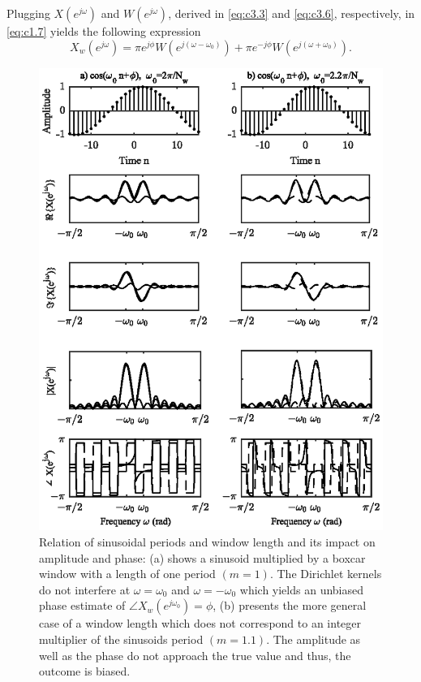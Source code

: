 \noindent Plugging $X(e^{j\omega})$ and $W(e^{j\omega})$, derived in \eqref{eq:c3.3} and \eqref{eq:c3.6}, respectively, in \eqref{eq:c1.7} yields the following expression
\begin{equation}\label{eq:c3.8}
	X_w(e^{j\omega})=\pi e^{j\phi}W(e^{j(\omega-\omega_0)})+\pi e^{-j\phi}W(e^{j(\omega+\omega_0)}).
\end{equation}

\begin{figure}[ht]
	\center %
	\includegraphics{figures/figure3_2.eps}
	\vspace{-0.6cm}
	\caption{Relation of sinusoidal periods and window length and its impact on amplitude and phase: (a) shows a sinusoid multiplied by a boxcar window with a length of one period $(m=1)$. The Dirichlet kernels do not interfere at $\omega=\omega_0$ and $\omega=-\omega_0$ which yields an unbiased phase estimate of $\angle X_w(e^{j\omega_0})=\phi$, (b) presents the more general case of a window length which does not correspond to an integer multiplier of the sinusoids period $(m=1.1)$. The amplitude as well as the phase do not approach the true value and thus, the outcome is biased.}\label{Figure32}
\end{figure}


